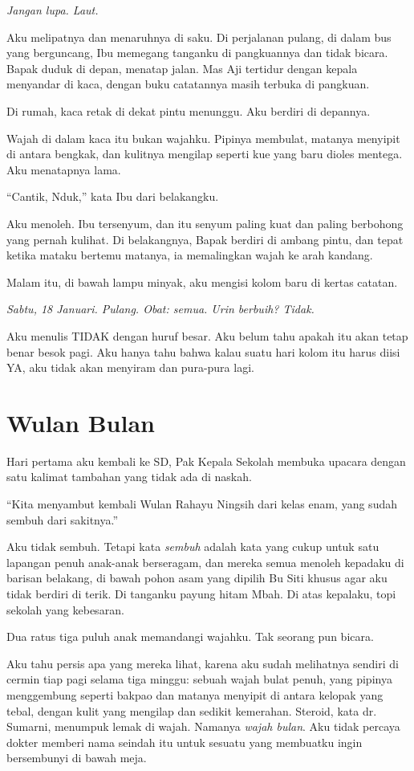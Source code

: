 \documentclass[11pt,twoside,openany]{book}
\begin{document}
\emph{Jangan lupa. Laut.}

Aku melipatnya dan menaruhnya di saku. Di perjalanan pulang, di dalam bus yang berguncang, Ibu memegang tanganku di pangkuannya dan tidak bicara. Bapak duduk di depan, menatap jalan. Mas Aji tertidur dengan kepala menyandar di kaca, dengan buku catatannya masih terbuka di pangkuan.

Di rumah, kaca retak di dekat pintu menunggu. Aku berdiri di depannya.

Wajah di dalam kaca itu bukan wajahku. Pipinya membulat, matanya menyipit di antara bengkak, dan kulitnya mengilap seperti kue yang baru dioles mentega. Aku menatapnya lama.

``Cantik, Nduk,'' kata Ibu dari belakangku.

Aku menoleh. Ibu tersenyum, dan itu senyum paling kuat dan paling berbohong yang pernah kulihat. Di belakangnya, Bapak berdiri di ambang pintu, dan tepat ketika mataku bertemu matanya, ia memalingkan wajah ke arah kandang.

Malam itu, di bawah lampu minyak, aku mengisi kolom baru di kertas catatan.

\emph{Sabtu, 18 Januari. Pulang. Obat: semua. Urin berbuih? Tidak.}

Aku menulis TIDAK dengan huruf besar. Aku belum tahu apakah itu akan tetap benar besok pagi. Aku hanya tahu bahwa kalau suatu hari kolom itu harus diisi YA, aku tidak akan menyiram dan pura-pura lagi.

\chapter{Wulan Bulan}
Hari pertama aku kembali ke SD, Pak Kepala Sekolah membuka upacara dengan satu kalimat tambahan yang tidak ada di naskah.

``Kita menyambut kembali Wulan Rahayu Ningsih dari kelas enam, yang sudah sembuh dari sakitnya.''

Aku tidak sembuh. Tetapi kata \emph{sembuh} adalah kata yang cukup untuk satu lapangan penuh anak-anak berseragam, dan mereka semua menoleh kepadaku di barisan belakang, di bawah pohon asam yang dipilih Bu Siti khusus agar aku tidak berdiri di terik. Di tanganku payung hitam Mbah. Di atas kepalaku, topi sekolah yang kebesaran.

Dua ratus tiga puluh anak memandangi wajahku. Tak seorang pun bicara.

Aku tahu persis apa yang mereka lihat, karena aku sudah melihatnya sendiri di cermin tiap pagi selama tiga minggu: sebuah wajah bulat penuh, yang pipinya menggembung seperti bakpao dan matanya menyipit di antara kelopak yang tebal, dengan kulit yang mengilap dan sedikit kemerahan. Steroid, kata dr. Sumarni, menumpuk lemak di wajah. Namanya \emph{wajah bulan}. Aku tidak percaya dokter memberi nama seindah itu untuk sesuatu yang membuatku ingin bersembunyi di bawah meja.
\end{document}
